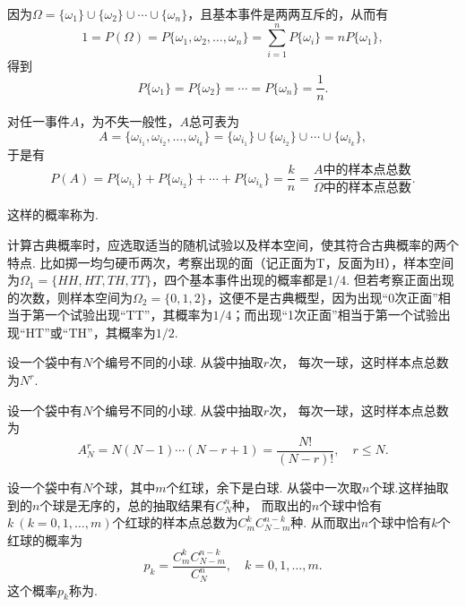 因为\(\Omega = \{\omega_1\}\cup\{\omega_2\}\cup\dotsb\cup\{\omega_n\}\)，且基本事件是两两互斥的，从而有\[
1 = P(\Omega) = P\{\omega_1, \omega_2, \dotsc, \omega_n\}
= \sum\limits_{i=1}^n P\{\omega_i\}
= n P\{\omega_1\},
\]得到\[
P\{\omega_1\} = P\{\omega_2\} = \dotsb = P\{\omega_n\} = \frac{1}{n}.
\]

对任一事件\(A\)，为不失一般性，\(A\)总可表为\[
A = \{\omega_{i_1},\omega_{i_2},\dotsc,\omega_{i_k}\}
= \{\omega_{i_1}\}\cup\{\omega_{i_2}\}\cup\dotsb\cup\{\omega_{i_k}\},
\]于是有\[
P(A) = P\{\omega_{i_1}\} + P\{\omega_{i_2}\} + \dotsb + P\{\omega_{i_k}\}
= \frac{k}{n} = \frac{A \text{中的样本点总数}}{\Omega \text{中的样本点总数}}.
\]

这样的概率称为.

计算古典概率时，应选取适当的随机试验以及样本空间，使其符合古典概率的两个特点.
比如掷一均匀硬币两次，考察出现的面（记正面为T，反面为H），样本空间为\(\Omega_1 = \{ HH, HT, TH, TT \}\)，四个基本事件出现的概率都是\(1/4\).
但若考察正面出现的次数，则样本空间为\(\Omega_2 = \{ 0,1,2 \}\)，这便不是古典概型，因为出现“0次正面”相当于第一个试验出现“TT”，其概率为\(1/4\)；而出现“1次正面”相当于第一个试验出现“HT”或“TH”，其概率为\(1/2\).

\begin{example}
设一个袋中有\(N\)个编号不同的小球.
从袋中抽取\(r\)次，
每次一球，这时样本点总数为\(N^r\).
\end{example}

\begin{example}
设一个袋中有\(N\)个编号不同的小球.
从袋中抽取\(r\)次，
每次一球，这时样本点总数为\[
A_N^r = N(N-1)\dotsb(N-r+1) = \frac{N!}{(N-r)!},
\quad
r \leq N.
\]
\end{example}

\begin{example}
设一个袋中有\(N\)个球，其中\(m\)个红球，余下是白球.
从袋中一次取\(n\)个球.这样抽取到的\(n\)个球是无序的，总的抽取结果有\(C_N^n\)种，
而取出的\(n\)个球中恰有\(k\ (k=0,1,\dotsc,m)\)个红球的样本点总数为\(C_m^k C_{N-m}^{n-k}\)种.
从而取出\(n\)个球中恰有\(k\)个红球的概率为\[
p_k = \frac{C_m^k C_{N-m}^{n-k}}{C_N^n},
\quad k=0,1,\dotsc,m.
\]
这个概率\(p_k\)称为.
\end{example}


